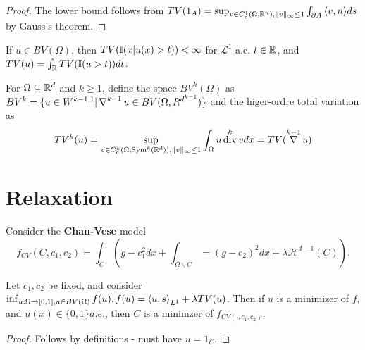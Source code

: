\begin{proof}
  The lower bound follows from $TV(1_{A}) = \sup_{v \in
    C_{c}^{1}(\Omega, \R^{n}), \| v \|_{\infty} \leq 1} \int_{\partial
    A} \IP{v, n} ds$ by Gauss's theorem.
\end{proof}

\begin{thm}
  \label{sec:total-vari-appl-3}
  If $u \in BV(\Omega)$, then $TV(\I{x|u(x) > t}) < \infty$ for
  $\mathcal{L}^{1}$-a.e. $t \in \mathbb{R}$, and $TV(u) = \int_{\R} TV(\I{u >
    t}) dt$.
\end{thm}

\begin{defn}
  \label{sec:total-vari-appl-4}
  For $\Omega \subseteq \mathbb{R}^{d}$ and $k \geq 1$, define the space
  $BV^{k}(\Omega)$ as $BV^{k} = \{ u \in W^{k-1, 1} | \operatorname*{\nabla}^{k-1}u \in
BV(\Omega, R^{d^{k-1}}) \}$ and the higer-ordre total variation as
\begin{align}
  \label{eq:56}
  TV^{k}(u) = \sup_{v \in C_{c}^{k}(\Omega, \operatorname*{Sym}^{k}(\mathbb{R}^{d})), \| v
    \|_{\infty} \leq 1} \int_{\Omega} u \operatorname*{div}^{k} v dx = TV(\operatorname*{\nabla}^{k-1}
  u)
\end{align}
\end{defn}

\section{Relaxation}
\label{sec:relaxation}

\begin{defn}
  Consider the \textbf{Chan-Vese} model
  \begin{equation}
    \label{eq:58}
    f_{CV}(C, c_{1}, c_{2}) = \int_{C} (g - c_{1}^{2} dx +
    \int_{\Omega \backslash C} = (g - c_{2})^{2} dx + \lambda \mathcal{H}^{d-1}(C)).
  \end{equation}
\end{defn}

\begin{thm}
  Let $c_{1}, c_{2}$ be fixed, and consider $\inf_{u: \Omega
    \rightarrow [0, 1], u \in BV(\Omega)} f(u), f(u) = \IP{u,
    s}_{L^{1}} + \lambda TV(u)$.  Then if $u$ is a minimizer of $f$,
  and $u(x) \in \{ 0, 1 \} a.e.$, then $C$ is a minimzer of
  $f_{CV(\cdot, c_{1}, c_{2})}$.
\end{thm}

\begin{proof}
  Follows by definitions - must have $u = 1_{C}$.
\end{proof}


